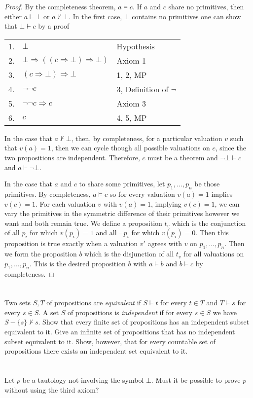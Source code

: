 \documentclass[12pt]{article}
\newenvironment{problem}
    {\begin{lrbox}{\mybox}\begin{minipage}{0.98\textwidth}}
    {\end{minipage}\end{lrbox}\begin{center}\framebox[\textwidth]{\usebox{\mybox}}\end{center}}
\renewcommand{\implies}{\Rightarrow}
\renewcommand{\models}{\vDash}
\newcommand{\proves}{\vdash}
\begin{document}
\begin{proof}
    By the completeness theorem, $a \models c$. If $a$ and $c$ share no primitives, then either $a \proves \bot$ or $a \not\proves \bot$. In the first case, $\bot$ contains no primitives one can show that $\bot \proves c$ by a proof
    \begin{center}
        \begin{tabular}{r l l}
            1. & $\bot$ & Hypothesis \\
            2. & $\bot \implies ((c \implies \bot) \implies \bot)$ & Axiom 1 \\
            3. & $(c \implies \bot) \implies \bot$ & 1, 2, MP \\
            4. & $\lnot\lnot c$ & 3, Definition of $\lnot$ \\
            5. & $\lnot\lnot c \implies c$ & Axiom 3 \\
            6. & $c$ & 4, 5, MP
        \end{tabular}
    \end{center}
    In the case that $a \not\proves \bot$, then, by completeness, for a particular valuation $v$ such that $v(a) = 1$, then we can cycle though all possible valuations on $c$, since the two propositions are independent. Therefore, $c$ must be a theorem and $\lnot \bot \proves c$ and $a \proves \lnot \bot$.
    
    In the case that $a$ and $c$ to share some primitives, let $p_1, \dots, p_n$ be those primitives. By completeness, $a \models c$ so for every valuation $v(a) = 1$ implies $v(c) = 1$. For each valuation $v$ with $v(a) = 1$, implying $v(c) = 1$, we can vary the primitives in the symmetric difference of their primitives however we want and both remain true. We define a proposition $t_v$ which is the conjunction of all $p_i$ for which $v(p_i) = 1$ and all $\lnot p_i$ for which $v(p_i) = 0$. Then this proposition is true exactly when a valuation $v'$ agrees with $v$ on $p_1, \dots, p_n$. Then we form the proposition $b$ which is the disjunction of all $t_v$ for all valuations on $p_1, \dots, p_n$. This is the desired proposition $b$ with $a \proves b$ and $b \proves c$ by completeness.
    
\end{proof}

\section{}
\begin{problem}
    Two sets $S, T$ of propositions are \textit{equivalent} if $S \proves t$ for every $t \in T$ and $T \proves s$ for every $s \in S$. A set $S$ of propositions is \textit{independent} if for every $s \in S$ we have $S - \{s\} \not\proves s$. Show that every finite set of propositions has an independent subset equivalent to it. Give an infinite set of propositions that has no independent subset equivalent to it. Show, however, that for every countable set of propositions there exists an independent set equivalent to it.
\end{problem}

\section{}
\begin{problem}
    Let $p$ be a tautology not involving the symbol $\bot$. Must it be possible to prove $p$ without using the third axiom?
\end{problem}
\end{document}
